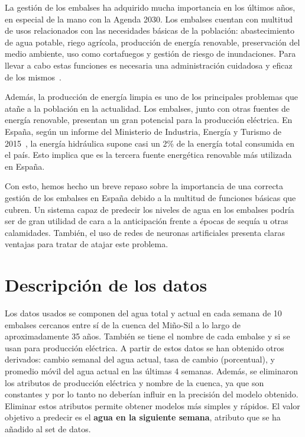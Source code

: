 \documentclass[12pt]{report} %
\begin{document}
La gestión de los embalses ha adquirido mucha importancia en los últimos años, en especial de la mano con la Agenda 2030. Los embalses cuentan con multitud de usos relacionados con las necesidades básicas de la población: abastecimiento de agua potable, riego agrícola, producción de energía renovable, preservación del medio ambiente, uso como cortafuegos y gestión de riesgo de inundaciones. Para llevar a cabo estas funciones es necesaria una administración cuidadosa y eficaz de los mismos~\cite{endesa-beneficiosembalses}.

Además, la producción de energía limpia es uno de los principales problemas que atañe a la población en la actualidad. Los embalses, junto con otras fuentes de energía renovable, presentan un gran potencial para la producción eléctrica. En España, según un informe del Ministerio de Industria, Energía y Turismo de 2015~\cite{la-energia-en-espanna}, la energía hidráulica supone casi un 2\% de la energía total consumida en el país. Esto implica que es la tercera fuente energética renovable más utilizada en España. 

Con esto, hemos hecho un breve repaso sobre la importancia de una correcta gestión de los embalses en España debido a la multitud de funciones básicas que cubren. Un sistema capaz de predecir los niveles de agua en los embalses podría ser de gran utilidad de cara a la anticipación frente a épocas de sequía u otras calamidades. También, el uso de redes de neuronas artificiales presenta claras ventajas para tratar de atajar este problema.

\chapter{Descripción de los datos}
\label{chap:datos}

    Los datos usados se componen del agua total y actual en cada semana de 10
    embalses cercanos entre sí de la cuenca del Miño-Sil a lo largo de aproximadamente
    35 años. También se tiene el nombre de cada embalse y si se usan para producción
    eléctrica. A partir de estos datos se han obtenido otros derivados:
    cambio semanal del agua actual, tasa de cambio (porcentual), y promedio móvil
    del agua actual en las últimas 4 semanas. Además, se eliminaron los
    atributos de producción eléctrica y nombre de la cuenca, ya que son constantes
    y por lo tanto no deberían influir en la precisión del modelo obtenido.
    Eliminar estos atributos permite obtener modelos más simples y
    rápidos. El valor objetivo a predecir es el \textbf{agua en la
    siguiente semana}, atributo que se ha añadido al set de datos.
\end{document}
